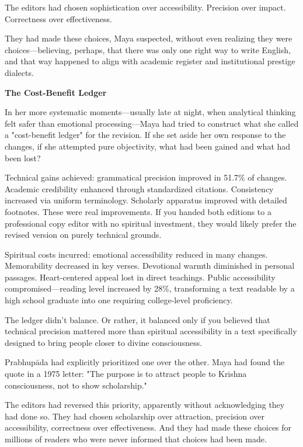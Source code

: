 \documentclass[12pt,twoside]{book}
\begin{document}
The editors had chosen sophistication over accessibility. Precision over impact. Correctness over effectiveness.

They had made these choices, Maya suspected, without even realizing they were choices—believing, perhaps, that there was only one right way to write English, and that way happened to align with academic register and institutional prestige dialects.

\textbf{\textbf{The Cost-Benefit Ledger}}

In her more systematic moments—usually late at night, when analytical thinking felt safer than emotional processing—Maya had tried to construct what she called a "cost-benefit ledger" for the revision. If she set aside her own response to the changes, if she attempted pure objectivity, what had been gained and what had been lost?

Technical gains achieved: grammatical precision improved in 51.7\% of changes. Academic credibility enhanced through standardized citations. Consistency increased via uniform terminology. Scholarly apparatus improved with detailed footnotes. These were real improvements. If you handed both editions to a professional copy editor with no spiritual investment, they would likely prefer the revised version on purely technical grounds.

Spiritual costs incurred: emotional accessibility reduced in many changes. Memorability decreased in key verses. Devotional warmth diminished in personal passages. Heart-centered appeal lost in direct teachings. Public accessibility compromised—reading level increased by 28\%, transforming a text readable by a high school graduate into one requiring college-level proficiency.

The ledger didn't balance. Or rather, it balanced only if you believed that technical precision mattered more than spiritual accessibility in a text specifically designed to bring people closer to divine consciousness.

Prabhupāda had explicitly prioritized one over the other. Maya had found the quote in a 1975 letter: "The purpose is to attract people to Krishna consciousness, not to show scholarship."

The editors had reversed this priority, apparently without acknowledging they had done so. They had chosen scholarship over attraction, precision over accessibility, correctness over effectiveness. And they had made these choices for millions of readers who were never informed that choices had been made.
\end{document}
